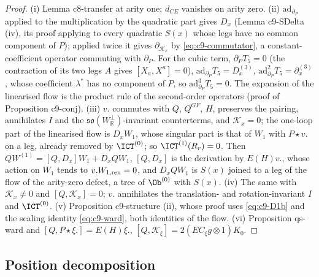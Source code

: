 \begin{proof}
(i) Lemma c8-transfer at arity one; $d_{CE}$ vanishes on arity zero. (ii) $\mathrm{ad}_{\partial_P}$ applied to the multiplication by the quadratic part gives $D_x$ (Lemma c9-SDelta (iv), its proof applying to every quadratic $S(x)$ whose legs have no common component of $P$); applied twice it gives $\partial_{\mathcal K_x}$ by \eqref{eq:c9-commutator}, a constant-coefficient operator commuting with $\partial_P$. For the cubic term, $\partial_PT_5=0$ (the contraction of its two legs $A$ gives $[X_a,X^a]=0$), $\mathrm{ad}_{\partial_P}T_5=D^{(3)}_x$, $\mathrm{ad}^2_{\partial_P}T_5=\partial^{(3)}_x$, whose coefficient $\lambda^*$ has no component of $P$, so $\mathrm{ad}^3_{\partial_P}T_5=0$. The expansion of the linearised flow is the product rule of the second-order operators (proof of Proposition c9-conj). (iii) $v.$ commutes with $Q$, $Q^{GF}$, $H$, preserves the pairing, annihilates $I$ and the $\mathfrak{so}(W^\perp_{\mathbb R})$-invariant counterterms, and $\mathcal K_x=0$; the one-loop part of the linearised flow is $D_xW_1$, whose singular part is that of $W_1$ with $P\star v.$ on a leg, already removed by $\ICT^{(0)}$; so $\ICT^{(1)}(R_r)=0$. Then $QW^{(1)}=[Q,D_x]W_1+D_xQW_1$, $[Q,D_x]$ is the derivation by $E(H)v.$, whose action on $W_1$ tends to $v.W_{1,{\rm ren}}=0$, and $D_xQW_1$ is $S(x)$ joined to a leg of the flow of the arity-zero defect, a tree of $\Ob^{(0)}$ with $S(x)$. (iv) The same with $\mathcal K_x\ne0$ and $[Q,\mathcal K_x]=0$; $v.$ annihilates the translation- and rotation-invariant $I$ and $\ICT^{(0)}$. (v) Proposition c9-structure (ii), whose proof uses \eqref{eq:c9-D1b} and the scaling identity \eqref{eq:c9-ward}, both identities of the flow. (vi) Proposition qs-ward and $[Q,P\star\xi.]=E(H)\xi.$, $[Q,\mathcal K_\xi]=2(E C_\xi g\otimes1)K_0$.
\end{proof}

\subsection{Position decomposition}

